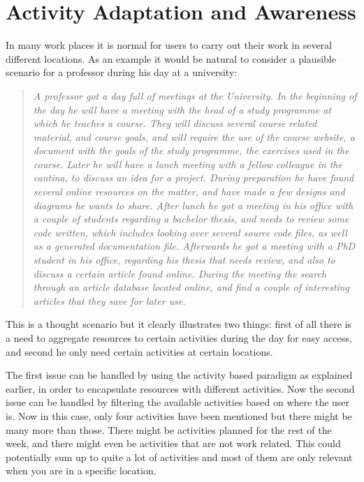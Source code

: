 \section{Activity Adaptation and Awareness}
In many work places it is normal for users to carry out their work in several different locations. As an example it would be natural to consider a plausible scenario for a professor during his day at a university:

\begin{quotation}
\emph{
A professor got a day full of meetings at the University. In the beginning of the day he will have a meeting with the head of a study programme at which he teaches a course. They will discuss several course related material, and course goals, and will require the use of the course website, a document with the goals of the study programme, the exercises used in the course. Later he will have a lunch meeting with a fellow colleague in the cantina, to discuss an idea for a project. During preparation he have found several online resources on the matter, and have made a few designs and diagrams he wants to share. After lunch he got a meeting in his office with a couple of students regarding a bachelor thesis, and needs to review some code written, which includes looking over several source code files, as well as a generated documentation file. Afterwards he got a meeting with a PhD student in his office, regarding his thesis that needs review, and also to discuss a certain article found online. During the meeting the search through an article database located online, and find a couple of interesting articles that they save for later use.
}
\end{quotation}

This is a thought scenario but it clearly illustrates two things: first of all there is a need to aggregate resources to certain activities during the day for easy access, and second he only need certain activities at certain locations.

The first issue can be handled by using the activity based paradigm as explained earlier, in order to encapsulate resources with different activities. Now the second issue can be handled by filtering the available activities based on where the user is. Now in this case, only four activities have been mentioned but there might be many more than those. There might be activities planned for the rest of the week, and there might even be activities that are not work related. This could potentially sum up to quite a lot of activities and most of them are only relevant when you are in a specific location.

